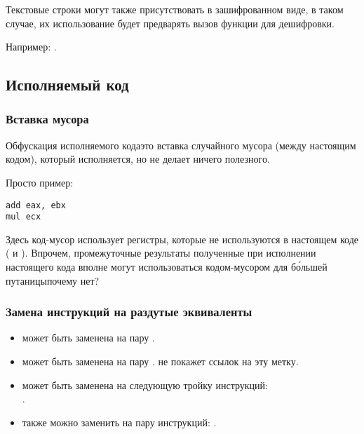 Текстовые строки могут также присутствовать в зашифрованном виде, в таком случае,
их использование будет предварять вызов функции для дешифровки.

Например: .

\subsection{Исполняемый код}

\subsubsection{Вставка мусора}

Обфускация исполняемого кода\EMDASH{}это вставка случайного мусора (между настоящим кодом), который исполняется, но не делает
ничего полезного.

Просто пример:

\begin{lstlisting}[caption=оригинальный код]
add	eax, ebx
mul	ecx
\end{lstlisting}



Здесь код-мусор использует регистры, которые не используются в настоящем коде ( и ).
Впрочем, промежуточные результаты полученные при исполнении настоящего кода вполне могут использоваться
кодом-мусором для б\'{о}льшей путаницы\EMDASH{}почему нет?

\subsubsection{Замена инструкций на раздутые эквиваленты}

\begin{itemize}
\item {} может быть заменена на пару .
\item {} может быть заменена на пару . 
\IDA{} не покажет ссылок на эту метку.
\item {} может быть заменена на следующую тройку инструкций:\\
.
\item {} также можно заменить на пару инструкций: .
\end{itemize}

